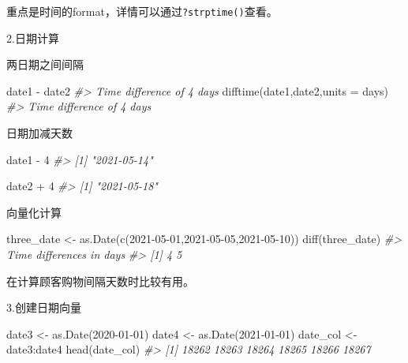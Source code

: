 \documentclass[
]{book}
\newenvironment{Shaded}{\begin{snugshade}}{\end{snugshade}}
\newcommand{\AttributeTok}[1]{\textcolor[rgb]{0.77,0.63,0.00}{#1}}
\newcommand{\CommentTok}[1]{\textcolor[rgb]{0.56,0.35,0.01}{\textit{#1}}}
\newcommand{\DecValTok}[1]{\textcolor[rgb]{0.00,0.00,0.81}{#1}}
\newcommand{\FunctionTok}[1]{\textcolor[rgb]{0.00,0.00,0.00}{#1}}
\newcommand{\NormalTok}[1]{#1}
\newcommand{\OtherTok}[1]{\textcolor[rgb]{0.56,0.35,0.01}{#1}}
\newcommand{\SpecialCharTok}[1]{\textcolor[rgb]{0.00,0.00,0.00}{#1}}
\newcommand{\StringTok}[1]{\textcolor[rgb]{0.31,0.60,0.02}{#1}}
\begin{document}
重点是时间的format，详情可以通过\texttt{?strptime()}查看。

2.日期计算

两日期之间间隔

\begin{Shaded}
\begin{Highlighting}[]
\NormalTok{date1 }\SpecialCharTok{{-}}\NormalTok{ date2}
\CommentTok{\#\textgreater{} Time difference of 4 days}
\FunctionTok{difftime}\NormalTok{(date1,date2,}\AttributeTok{units =} \StringTok{\textquotesingle{}days\textquotesingle{}}\NormalTok{)}
\CommentTok{\#\textgreater{} Time difference of 4 days}
\end{Highlighting}
\end{Shaded}

日期加减天数

\begin{Shaded}
\begin{Highlighting}[]
\NormalTok{date1 }\SpecialCharTok{{-}} \DecValTok{4}
\CommentTok{\#\textgreater{} [1] "2021{-}05{-}14"}

\NormalTok{date2 }\SpecialCharTok{+} \DecValTok{4}
\CommentTok{\#\textgreater{} [1] "2021{-}05{-}18"}
\end{Highlighting}
\end{Shaded}

向量化计算

\begin{Shaded}
\begin{Highlighting}[]
\NormalTok{three\_date }\OtherTok{\textless{}{-}} \FunctionTok{as.Date}\NormalTok{(}\FunctionTok{c}\NormalTok{(}\StringTok{\textquotesingle{}2021{-}05{-}01\textquotesingle{}}\NormalTok{,}\StringTok{\textquotesingle{}2021{-}05{-}05\textquotesingle{}}\NormalTok{,}\StringTok{\textquotesingle{}2021{-}05{-}10\textquotesingle{}}\NormalTok{))}
\FunctionTok{diff}\NormalTok{(three\_date)}
\CommentTok{\#\textgreater{} Time differences in days}
\CommentTok{\#\textgreater{} [1] 4 5}
\end{Highlighting}
\end{Shaded}

在计算顾客购物间隔天数时比较有用。

3.创建日期向量

\begin{Shaded}
\begin{Highlighting}[]
\NormalTok{date3 }\OtherTok{\textless{}{-}} \FunctionTok{as.Date}\NormalTok{(}\StringTok{\textquotesingle{}2020{-}01{-}01\textquotesingle{}}\NormalTok{)}
\NormalTok{date4 }\OtherTok{\textless{}{-}} \FunctionTok{as.Date}\NormalTok{(}\StringTok{\textquotesingle{}2021{-}01{-}01\textquotesingle{}}\NormalTok{)}
\NormalTok{date\_col }\OtherTok{\textless{}{-}}\NormalTok{ date3}\SpecialCharTok{:}\NormalTok{date4}
\FunctionTok{head}\NormalTok{(date\_col)}
\CommentTok{\#\textgreater{} [1] 18262 18263 18264 18265 18266 18267}
\end{Highlighting}
\end{Shaded}
\end{document}
